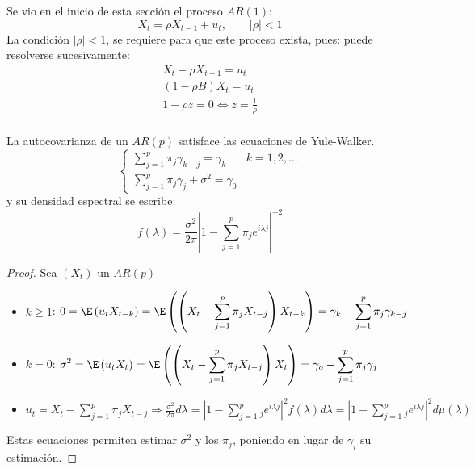 \begin{ejemplo}
 Se vio en el inicio de esta secci\'{o}n el proceso $AR(1)$:
\[
X_{t} =\rho X_{t-1} +u_{t} ,\qquad \left| \rho \right|<1
\]
La condici\'{o}n $\left| \rho \right|<1$, se requiere para que este proceso exista, pues: puede resolverse sucesivamente:
\begin{gather*}
 X_{t} -\rho X_{t-1} =u_{t} \\ 
 \left( {1-\rho B} \right)X_{t} =u_{t} \\ 
 1-\rho z=0 \Longleftrightarrow z=\frac{1}{\rho } \\ 
\end{gather*}
\end{ejemplo}

\begin{teorema}
 La autocovarianza de un $AR(p)$ satisface las ecuaciones de Yule-Walker.
\[
\begin{cases}
 \displaystyle\sum_{j=1}^p {\pi_{j} \gamma_{k-j} } =\gamma_{k} & k=1,2,\ldots\\
 \displaystyle\sum_{j=1}^p {\pi_{j} \gamma_{j} +\sigma^{2}=\gamma_{0} }
\end{cases}
\]
y su densidad espectral se escribe:
\[
f\left( \lambda \right)=\frac{\sigma^{2}}{2\pi }\left| {1-\sum_{j=1}^p {\pi_{j} e^{i\lambda j}} } \right|^{-2}
\]
\end{teorema}


\begin{proof}
Sea $\left( {X_{t} } \right)$ un $AR (p)$
\begin{itemize}
\item $k\ge 1$: $\displaystyle 0=\E\left( {u_{t} X_{t-k} } \right)=\E\left( {\left( {X_{t} -\sum_{j=1}^p {\pi_{j} X_{t-j} } } \right)X_{t-k} } \right)=\gamma_{k} -\sum_{j=1}^p {\pi_{j} \gamma_{k-j} } $ 

\item $k=0$: $\displaystyle\sigma^{2}=\E\left( {u_{t} X_{t} } \right)=\E\left( {\left( {X_{t} -\sum_{j=1}^p {\pi_{j} X_{t-j} } } \right)X_{t} } \right)=\gamma_{o} -\sum_{j=1}^p {\pi_{j} \gamma_{j} } $

\item $\displaystyle u_{t} =X_{t} -\sum_{j=1}^p {\pi_{j} X_{t-j} \Rightarrow \frac{\sigma^{2}}{2\pi }d\lambda =\left| {1-\sum_{j=1}^p {_{j} e^{i\lambda j}} } \right|^{2}} f(\lambda )d\lambda =\left| {1-\sum_{j=1}^p {_{j} e^{i\lambda j}} } \right|^{2}d\mu \left( \lambda \right)$
\end{itemize}

Estas ecuaciones permiten estimar $\sigma^{2}$ y los $\pi_{j} $, poniendo en lugar de $\gamma_{i} $ su estimaci\'{o}n.
\end{proof}


